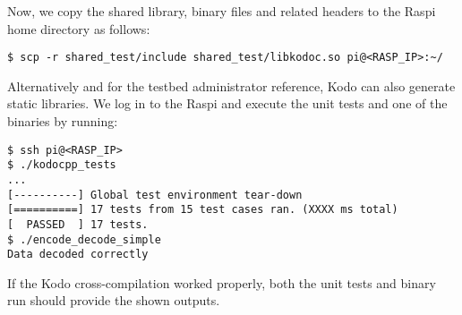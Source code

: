 Now, we copy the shared library, binary files and related headers to the
\ac{Raspi} home directory as follows:

\begin{lstlisting}[]
$ scp -r shared_test/include shared_test/libkodoc.so pi@<RASP_IP>:~/
\end{lstlisting}
\FloatBarrier
\vspace{-5mm}

Alternatively and for the testbed administrator reference, Kodo can also
generate static libraries. We log in to the \ac{Raspi} and execute the unit
tests and one of the binaries by running:

\begin{lstlisting}[]
$ ssh pi@<RASP_IP>
$ ./kodocpp_tests
...
[----------] Global test environment tear-down
[==========] 17 tests from 15 test cases ran. (XXXX ms total)
[  PASSED  ] 17 tests.
$ ./encode_decode_simple
Data decoded correctly
\end{lstlisting}
\FloatBarrier
\vspace{-5mm}

If the Kodo cross-compilation worked properly, both the unit tests and
binary run should provide the shown outputs.

